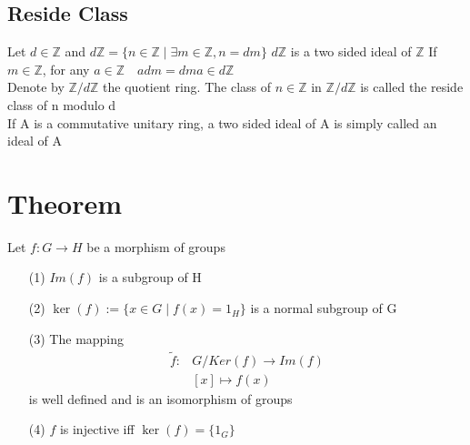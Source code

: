 \documentclass{book}
\begin{document}
\subsection{Reside Class}
Let $d\in \mathbb{Z} $ and $d\mathbb{Z} =\{n\in \mathbb{Z} \mid\exists m\in\mathbb{Z} ,n=dm\}$ $d\mathbb{Z} $ is a two sided ideal of $\mathbb{Z} $ If $m\in \mathbb{Z} $, for any $a\in \mathbb{Z} \quad adm=dma\in d\mathbb{Z}$\\
Denote by $\mathbb{Z} /d\mathbb{Z} $ the quotient ring. The class of $n\in \mathbb{Z} $ in $\mathbb{Z} /d\mathbb{Z} $ is called the reside class of n modulo d\\
If A is a commutative unitary ring, a two sided ideal of A is simply called an ideal of A
\section{Theorem}
Let $f:G\rightarrow H$ be a morphism of groups \begin{itemize}
    \item[(1)] $Im(f)$ is a subgroup of H
    \item[(2)] $\ker(f):=\{x\in G\mid f(x)=1_H\}$ is a normal subgroup of G
    \item[(3)] The mapping $$\begin{aligned}
    \widetilde{f}:&G/Ker(f)\rightarrow Im(f)\\
    &[x]\mapsto f(x)
    \end{aligned}$$
    is well defined and is an isomorphism of groups
    \item[(4)] $f$ is injective iff $\ker(f)=\{1_G\}$
\end{itemize}
\end{document}
